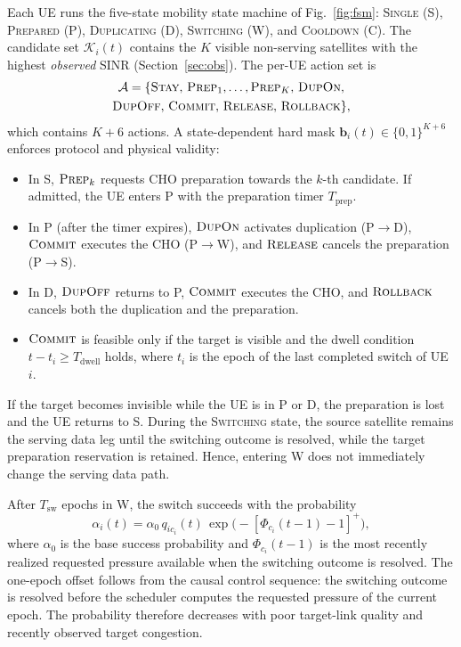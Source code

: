 \documentclass[journal]{IEEEtran}
\newcommand{\Aset}{\mathcal{A}}
\begin{document}
Each UE runs the five-state mobility state machine of Fig.~\ref{fig:fsm}:
\textsc{Single} (\textsf{S}), \textsc{Prepared} (\textsf{P}),
\textsc{Duplicating} (\textsf{D}), \textsc{Switching} (\textsf{W}), and
\textsc{Cooldown} (\textsf{C}). The candidate set $\mathcal{K}_i(t)$ contains
the $K$ visible non-serving satellites with the highest \emph{observed} SINR
(Section~\ref{sec:obs}). The per-UE action set is
\begin{multline}
\Aset=\{\textsc{Stay},\,\textsc{Prep}_1,\dots,\textsc{Prep}_K,\,\textsc{DupOn},\\
\textsc{DupOff},\,\textsc{Commit},\,\textsc{Release},\,\textsc{Rollback}\},
\end{multline}
which contains $K+6$ actions. A state-dependent hard mask
$\mathbf{b}_i(t)\in\{0,1\}^{K+6}$ enforces protocol and physical validity:
\begin{itemize}
\item In \textsf{S}, $\textsc{Prep}_k$ requests CHO preparation towards the
$k$-th candidate. If admitted, the UE enters \textsf{P} with the preparation
timer $T_{\mathrm{prep}}$.
\item In \textsf{P} (after the timer expires), $\textsc{DupOn}$ activates
duplication (\textsf{P}$\to$\textsf{D}), $\textsc{Commit}$ executes the CHO
(\textsf{P}$\to$\textsf{W}), and $\textsc{Release}$ cancels the preparation
(\textsf{P}$\to$\textsf{S}).
\item In \textsf{D}, $\textsc{DupOff}$ returns to \textsf{P}, $\textsc{Commit}$
executes the CHO, and $\textsc{Rollback}$ cancels both the duplication and the
preparation.
\item $\textsc{Commit}$ is feasible only if the target is visible and the
dwell condition $t-t_i\ge T_{\mathrm{dwell}}$ holds, where $t_i$ is the epoch
of the last completed switch of UE $i$.
\end{itemize}
If the target becomes invisible while the UE is in \textsf{P} or \textsf{D},
the preparation is lost and the UE returns to \textsf{S}. During the
\textsc{Switching} state, the source satellite remains the serving data leg
until the switching outcome is resolved, while the target preparation
reservation is retained. Hence, entering \textsf{W} does not immediately
change the serving data path.

After $T_{\mathrm{sw}}$ epochs in \textsf{W}, the switch succeeds with the
probability
\begin{equation}
\alpha_i(t)=\alpha_0\,q_{ic_i}(t)\,\exp\!\big(-[\Phi_{c_i}(t-1)-1]^+\big),
\label{eq:hosuccess}
\end{equation}
where $\alpha_0$ is the base success probability and $\Phi_{c_i}(t-1)$ is the
most recently realized requested pressure available when the switching
outcome is resolved. The one-epoch offset follows from the causal control
sequence: the switching outcome is resolved before the scheduler computes the
requested pressure of the current epoch. The probability therefore decreases
with poor target-link quality and recently observed target congestion.
\end{document}
